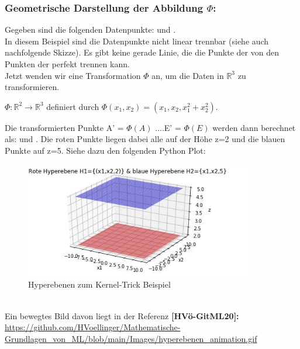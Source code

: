 \documentclass[12pt]{article}
\begin{document}
\subsubsection{Geometrische Darstellung der Abbildung $ \Phi $:}
Gegeben sind die folgenden Datenpunkte: {\color{red}{Klasse +1: A(1,1), B(-1,1)}} und {\color{blue}{Klasse -1: C(2,1), D(1,-2) und E(-2,1)}}.\\
In diesem Beispiel sind die Datenpunkte nicht linear trennbar (siehe auch nachfolgende Skizze). Es gibt keine gerade Linie, die die Punkte der {\color{red}{Klasse +1}} von den Punkten der {\color{blue}{Klasse -1}} perfekt trennen kann.\\
Jetzt wenden wir eine Transformation $ \Phi $ an, um die Daten in $\mathbb{R}^3$ zu transformieren.  
\begin{center}
 $\Phi:\mathbb{R}^2 \rightarrow\mathbb{R}^3$ definiert durch  $\Phi(x_1,x_2) = (x_1,x_2, x_1^2 + x_2^2)$. 
\end{center} 
Die transformierten Punkte A' = $\Phi(A)$ ....E' = $\Phi(E)$ werden dann berechnet als: {\color{red}{Klasse +1: A'(1,1,2), B'(-1,1,2)}} und {\color{blue}{Klasse -1: C'(2,1,5), D'(1,-2,5) und E'(-2,1,5)}}. Die roten Punkte liegen dabei alle auf der Höhe z=2 und die blauen Punkte auf z=5. Siehe dazu den folgenden Python Plot:\\[5.2cm]
%
\begin{figure}[ht]
  \centering
  \hspace*{-0.5cm} 
  \includegraphics[width=0.9\textwidth]{Kernel-Hyperebene-Bild}
  \caption{Hyperebenen zum Kernel-Trick Beispiel}
  \label{fig:SVM_Ebenen}
\end{figure}\\
%
Ein bewegtes Bild davon liegt in der Referenz \textbf{[HVö-GitML20]:}\\
\url{https://github.com/HVoellinger/Mathematische-Grundlagen_von_ML/blob/main/Images/hyperebenen_animation.gif}\\[0.2cm]
\end{document}
